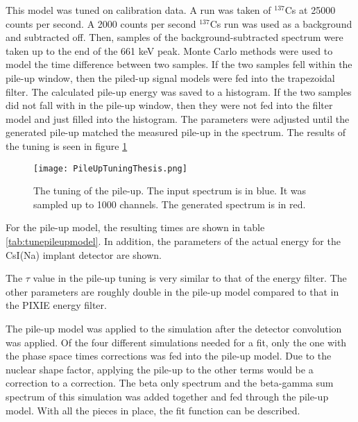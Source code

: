 \documentclass[main.tex]{subfiles}
\begin{document}
This model was tuned on calibration data. 
A run was taken of $^{137}$Cs at 25000 counts per second.
A 2000 counts per second $^{137}$Cs run was used as a background and subtracted off.
Then, samples of the background-subtracted spectrum were taken up to the end of the 661 keV peak.
Monte Carlo methods were used to model the time difference between two samples.
If the two samples fell within the pile-up window, then the piled-up signal models were fed into the trapezoidal filter.
The calculated pile-up energy was saved to a histogram.
If the two samples did not fall with in the pile-up window, then they were not fed into the filter model and just filled into the histogram.
The parameters were adjusted until the generated pile-up matched the measured pile-up in the spectrum.
The results of the tuning is seen in figure \ref{fig:pileuptune}

\begin{figure}[!htb]
	\centerline{\texttt{[image: PileUpTuningThesis.png]}}
	\caption{The tuning of the pile-up.
		 The input spectrum is in blue.
		 It was sampled up to 1000 channels.
		 The generated spectrum is in red.}
	\label{fig:pileuptune}
\end{figure}

For the pile-up model, the resulting times are shown in table \ref{tab:tunepileupmodel}.
In addition, the parameters of the actual energy for the CsI(Na) implant detector are shown.

\begin{table}[!hbt]
	\centering
	\caption{Pile-up model parameters compared to the energy filter parameters}
		\label{tab:tunepileupmodel}
\end{table}

The $\tau$ value in the pile-up tuning is very similar to that of the energy filter.
The other parameters are roughly double in the pile-up model compared to that in the PIXIE energy filter.

The pile-up model was applied to the simulation after the detector convolution was applied. 
Of the four different simulations needed for a fit, only the one with the phase space times corrections was fed into the pile-up model.
Due to the nuclear shape factor, applying the pile-up to the other terms would be a correction to a correction. 
The beta only spectrum and the beta-gamma sum spectrum of this simulation was added together and fed through the pile-up model.
With all the pieces in place, the fit function can be described. 
\end{document}
